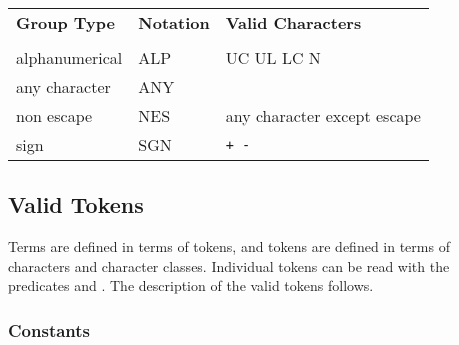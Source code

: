 \begin{flushleft}
\begin{tabular}{lll}
\\
{\bf Group Type} & {\bf Notation} & {\bf Valid Characters} \\
\\
alphanumerical  &       ALP     &UC UL LC N\\
any character   &       ANY     &\\
non escape      &       NES     &any character except escape\\
sign            &       SGN     &\verb'+ -'\\
\end{tabular}
\end{flushleft}


\subsection{Valid Tokens}
\label{tokendef}

Terms are defined in terms of tokens, and tokens are defined in terms of
characters and character classes.
Individual tokens can be read with the predicates
 and
.
The description of the valid tokens follows.

\subsubsection{Constants}

